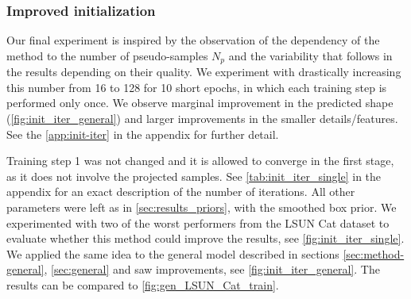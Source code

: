 \subsubsection{Improved initialization}
\label{sec:init_iter}
Our final experiment is inspired by the observation of the dependency of the method to the number of pseudo-samples $N_p$ and the variability that follows in the results depending on their quality. We experiment with drastically increasing this number from 16 to 128 for 10 short epochs, in which each training step is performed only once. We observe marginal improvement in the predicted shape (\autoref{fig:init_iter_general}) and larger improvements in the smaller details/features. See the \autoref{app:init-iter} in the appendix for further detail.

Training step 1 was not changed and it is allowed to converge in the first stage, as it does not involve the projected samples. See \autoref{tab:init_iter_single} in the appendix for an exact description of the number of iterations. All other parameters were left as in \autoref{sec:results_priors}, with the smoothed box prior. We experimented with two of the worst performers from the LSUN Cat dataset to evaluate whether this method could improve the results, see \autoref{fig:init_iter_single}. We applied the same idea to the general model described in sections \ref{sec:method-general}, \ref{sec:general} and saw improvements, see \autoref{fig:init_iter_general}. The results can be compared to \autoref{fig:gen_LSUN_Cat_train}.
